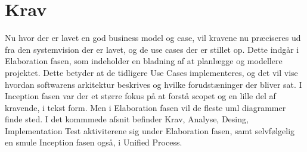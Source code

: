 \chapter{Krav}\label{ch:krav}
Nu hvor der er lavet en god business model og case, vil kravene nu præciseres ud fra den systemvision der er lavet, og de use cases der er stillet op. Dette indgår i Elaboration fasen, som indeholder en bladning af at planlægge og modellere projektet. Dette betyder at de tidligere Use Cases implementeres, og det vil vise hvordan softwarens arkitektur beskrives og hvilke forudstæninger der bliver sat. I Inception fasen var der et større fokus på at forstå scopet og en lille del af kravende, i tekst form. Men i Elaboration fasen vil de fleste uml diagrammer finde sted\cite{Larman2004}. I det kommmede afsnit befinder Krav, Analyse, Desing, Implementation Test aktiviterene sig under Elaboration fasen, samt selvfølgelig en smule Inception fasen også, i Unified Process\cite{UnifiedProcess}. 



 